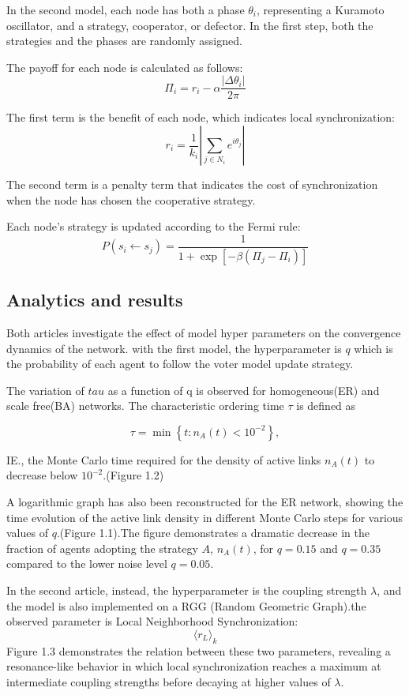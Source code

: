 \noindent
In the second model, each node has both a phase \(\theta_i\), representing a Kuramoto oscillator, and a strategy, cooperator, or defector. In the first step, both the strategies and the phases are randomly assigned.

\noindent
The payoff for each node is calculated as follows:
\[
\Pi_i =
r_i
-
\alpha
\frac{\left|\Delta \theta_i\right|}{2\pi}
\]

\noindent
The first term is the benefit of each node, which indicates local synchronization:
\[
r_i = \frac{1}{k_i}
\left|
\sum_{j \in N_i}
e^{i\theta_j}
\right|
\]

\noindent
The second term is a penalty term that indicates the cost of synchronization when the node has chosen the cooperative strategy.

\noindent
Each node's strategy is updated according to the Fermi rule:
\[
P(s_i \leftarrow s_j)
=
\frac{1}
{1+\exp\!\left[-\beta\left(\Pi_j-\Pi_i\right)\right]}
\]
\subsection{Analytics and results}
Both articles investigate the effect of model hyper parameters on the convergence dynamics of the network.
with the first model, the hyperparameter is \(q\) which is the probability of each agent to follow the voter model update strategy.

\noindent
The variation of \(tau\) as a function of q is observed for homogeneous(ER) and scale free(BA) networks.
The characteristic ordering time $\tau$ is defined as

\[
\tau = \min \left\{ t : n_A(t) < 10^{-2} \right\},
\]

\noindent
IE., the Monte Carlo time required for the density of active links $n_A(t)$ to decrease below $10^{-2}$.(Figure 1.2)

\noindent
A logarithmic graph has also been reconstructed for the ER network, showing the time evolution of the active link density in different Monte Carlo steps for various values of $q$.(Figure 1.1).The figure demonstrates a dramatic decrease in the fraction of agents adopting the strategy $A$, $n_A(t)$, for $q=0.15$ and $q=0.35$ compared to the lower noise level $q=0.05$.

\noindent
In the second article, instead, the hyperparameter is the coupling strength $\lambda$, and the model is also implemented on a RGG (Random Geometric Graph).the observed parameter is Local Neighborhood Synchronization: \[
\langle r_L \rangle_k
\]Figure 1.3 demonstrates the relation between these two parameters, revealing a resonance-like behavior in which local synchronization reaches a maximum at intermediate coupling strengths before decaying at higher values of $\lambda$.


